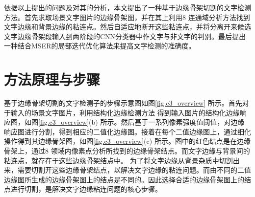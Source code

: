    依据以上提出的问题及对其的分析，本文提出了一种基于边缘骨架切割的文字检测方法。首先求取场景文字图片的边缘骨架图，并在其上利用8 连通域分析方法找到文字边缘和背景边缘的粘连点。然后自适应地断开这些粘连点，并将分离开来候选文字边缘骨架段输入到两阶段的CNN分类器中作文字与非文字的判别。最后提出一种结合MSER的局部迭代优化算法来提高文字检测的准确度。

    \section{方法原理与步骤}

    基于边缘骨架切割的文字检测子的步骤示意图如图\ref{fig.c3_overview} 所示。首先对于输入的场景文字图片，利用结构化边缘检测方法\cite{Dollar2015Fast} 得到输入图片的结构化边缘响应图，如图\ref{fig.c3_overview}(b) 所示。然后基于一系列像素强度值阈值，对边缘响应图进行分割，得到相应的二值化边缘图。接着在每个二值边缘图上，通过细化操作得到其边缘骨架图，如图\ref{fig.c3_overview}(c) 所示。图中的红色结点是在边缘骨架上，通过8 领域内像素点分析所找到的边缘骨架结点。而文字边缘与背景间的粘连点，就存在于这些边缘骨架结点中。
    为了将文字边缘从背景杂质中切割出来，需要切割开这些边缘骨架结点，以解决文字边缘的粘连问题。而由不同的二值边缘图所生成的边缘骨架图上的结点是不同的。因此选择合适的边缘骨架图上的结点进行切割，是解决文字边缘粘连问题的核心步骤。


